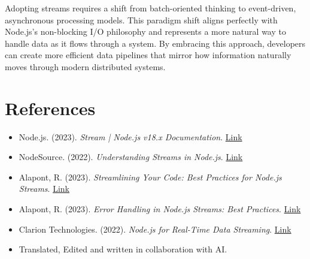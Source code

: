 \documentclass[12pt,letterpaper]{article}
\begin{document}
Adopting streams requires a shift from batch-oriented thinking to event-driven, asynchronous processing models. This paradigm shift aligns perfectly with Node.js's non-blocking I/O philosophy and represents a more natural way to handle data as it flows through a system. By embracing this approach, developers can create more efficient data pipelines that mirror how information naturally moves through modern distributed systems.


\section{References}

\begin{itemize}
    \item Node.js. (2023). \textit{Stream | Node.js v18.x Documentation}. \href{https://nodejs.org/docs/latest-v18.x/api/stream.html}{Link}
    
    \item NodeSource. (2022). \textit{Understanding Streams in Node.js}. \href{https://nodesource.com/blog/understanding-streams-in-nodejs}{Link}
    
    \item Alapont, R. (2023). \textit{Streamlining Your Code: Best Practices for Node.js Streams}. \href{https://dev.to/ruben_alapont/streamlining-your-code-best-practices-for-nodejs-streams-1ji0}{Link}
    
    \item Alapont, R. (2023). \textit{Error Handling in Node.js Streams: Best Practices}. \href{https://dev.to/ruben_alapont/error-handling-in-nodejs-streams-best-practices-dhb}{Link}
    
    \item Clarion Technologies. (2022). \textit{Node.js for Real-Time Data Streaming}. \href{https://www.clariontech.com/blog/node.js-real-time-data-streaming}{Link}

    \item Translated, Edited and written in collaboration with AI.
\end{itemize}
\end{document}
